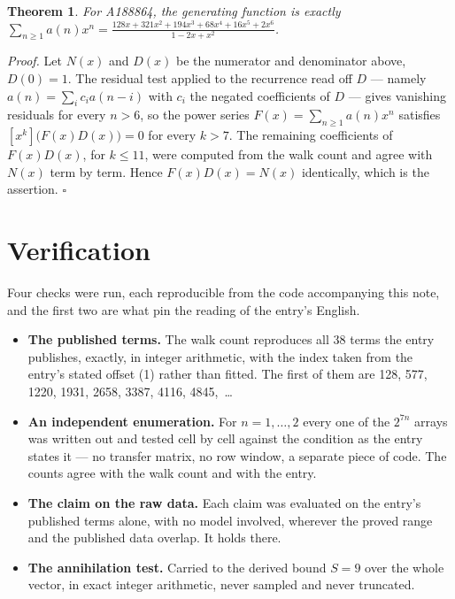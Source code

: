 \documentclass[11pt]{article}
\newtheorem{theorem}{Theorem}
\theoremstyle{definition}
\begin{document}
\begin{theorem} For A188864, the generating function is exactly $\sum_{n\ge 1} a(n)x^n = \frac{128x + 321x^{2} + 194x^{3} + 68x^{4} + 16x^{5} + 2x^{6}}{1 - 2x + x^{2}}$.\end{theorem}

{\itshape Proof.} Let $N(x)$ and $D(x)$ be the numerator and denominator above, $D(0)=1$. The residual test applied to the recurrence read off $D$ --- namely $a(n) = \sum_i c_i a(n-i)$ with $c_i$ the negated coefficients of $D$ --- gives vanishing residuals for every $n > 6$, so the power series $F(x)=\sum_{n\ge 1}a(n)x^n$ satisfies $[x^k]\bigl(F(x)D(x)\bigr) = 0$ for every $k > 7$. The remaining coefficients of $F(x)D(x)$, for $k \le 11$, were computed from the walk count and agree with $N(x)$ term by term. Hence $F(x)D(x) = N(x)$ identically, which is the assertion. $\square$

\section{Verification}

Four checks were run, each reproducible from the code accompanying this note, and the first two are what pin the reading of the entry's English.

\begin{itemize}

\item {\bfseries The published terms.} The walk count reproduces all 38 terms the entry publishes, exactly, in integer arithmetic, with the index taken from the entry's stated offset (1) rather than fitted. The first of them are 128, 577, 1220, 1931, 2658, 3387, 4116, 4845,~\dots

\item {\bfseries An independent enumeration.} For $n = 1,\dots,2$ every one of the $2^{7n}$ arrays was written out and tested cell by cell against the condition as the entry states it --- no transfer matrix, no row window, a separate piece of code. The counts agree with the walk count and with the entry.

\item {\bfseries The claim on the raw data.} Each claim was evaluated on the entry's published terms alone, with no model involved, wherever the proved range and the published data overlap. It holds there.

\item {\bfseries The annihilation test.} Carried to the derived bound $S = 9$ over the whole vector, in exact integer arithmetic, never sampled and never truncated.

\end{itemize}
\end{document}
